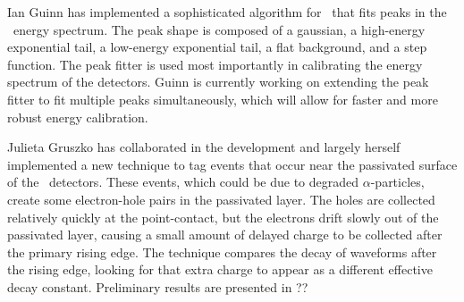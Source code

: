 Ian Guinn has implemented a sophisticated algorithm for \MJ\ that fits peaks in the \MJDemo\ energy spectrum. The peak shape is composed of a gaussian, a high-energy exponential tail, a low-energy exponential tail, a flat background, and a step function. The peak fitter is used most importantly in calibrating the energy spectrum of the detectors. Guinn is currently working on extending the peak fitter to fit multiple peaks simultaneously, which will allow for faster and more robust energy calibration.\newline

Julieta Gruszko has collaborated in the development and largely herself implemented a new technique to tag events that occur near the passivated surface of the \MJ\ detectors. These events, which could be due to degraded $\alpha$-particles, create some electron-hole pairs in the passivated layer. The holes are collected relatively quickly at the point-contact, but the electrons drift slowly out of the passivated layer, causing a small amount of delayed charge to be collected after the primary rising edge. The technique compares the decay of waveforms after the rising edge, looking for that extra charge to appear as a different effective decay constant. Preliminary results are presented in ??
%
%
%
%
%
%
%
%
%
%
%

